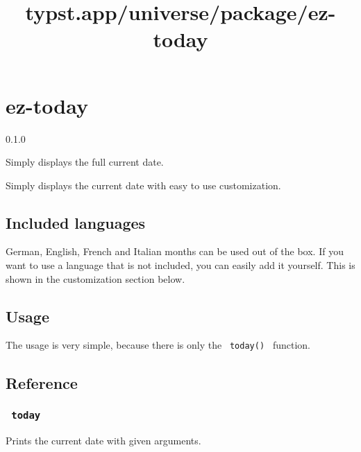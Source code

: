 \title{typst.app/universe/package/ez-today}

\label{banner}
\section{ez-today}\label{ez-today}

{ 0.1.0 }

Simply displays the full current date.

\label{readme}
Simply displays the current date with easy to use customization.

\subsection{Included languages}\label{included-languages}

German, English, French and Italian months can be used out of the box.
If you want to use a language that is not included, you can easily add
it yourself. This is shown in the customization section below.

\subsection{Usage}\label{usage}

The usage is very simple, because there is only the \texttt{\ today()\ }
function.

\begin{Shaded}
\begin{Highlighting}[]

\end{Highlighting}
\end{Shaded}

\subsection{Reference}\label{reference}

\subsubsection{\texorpdfstring{\texttt{\ today\ }}{ today }}\label{today}

Prints the current date with given arguments.

\begin{Shaded}
\begin{Highlighting}[]
\end{Highlighting}
\end{Shaded}

